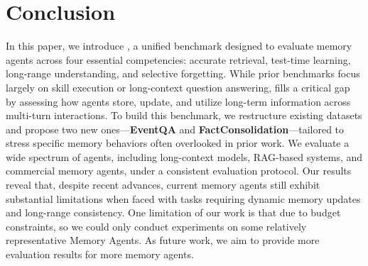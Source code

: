 \section{Conclusion}
In this paper, we introduce \textbf{\ours}, a unified benchmark designed to evaluate memory agents across four essential competencies: accurate retrieval, test-time learning, long-range understanding, and selective forgetting. While prior benchmarks focus largely on skill execution or long-context question answering, \ours fills a critical gap by assessing how agents store, update, and utilize long-term information across multi-turn interactions. To build this benchmark, we restructure existing datasets and propose two new ones—\textbf{EventQA} and \textbf{FactConsolidation}—tailored to stress specific memory behaviors often overlooked in prior work. We evaluate a wide spectrum of agents, including long-context models, RAG-based systems, and commercial memory agents, under a consistent evaluation protocol. Our results reveal that, despite recent advances, current memory agents still exhibit substantial limitations when faced with tasks requiring dynamic memory updates and long-range consistency. 
One limitation of our work is that due to budget constraints, so we could only conduct experiments on some relatively representative Memory Agents. 
As future work, we aim to provide more evaluation results for more memory agents. 



